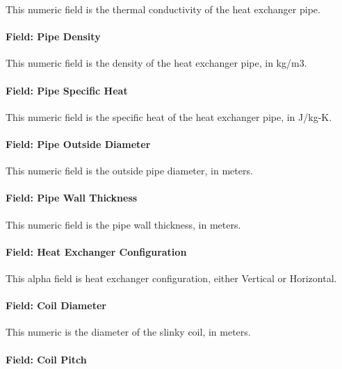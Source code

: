 This numeric field is the thermal conductivity of the heat exchanger pipe.

\paragraph{Field: Pipe Density}\label{field-pipe-density}

This numeric field is the density of the heat exchanger pipe, in kg/m3.

\paragraph{Field: Pipe Specific Heat}\label{field-pipe-specific-heat}

This numeric field is the specific heat of the heat exchanger pipe, in J/kg-K.

\paragraph{Field: Pipe Outside Diameter}\label{field-pipe-outside-diameter}

This numeric field is the outside pipe diameter, in meters.

\paragraph{Field: Pipe Wall Thickness}\label{field-pipe-wall-thickness}

This numeric field is the pipe wall thickness, in meters.

\paragraph{Field: Heat Exchanger Configuration}\label{field-heat-exchanger-configuration}

This alpha field is heat exchanger configuration, either Vertical or Horizontal.

\paragraph{Field: Coil Diameter}\label{field-coil-diameter}

This numeric is the diameter of the slinky coil, in meters.

\paragraph{Field: Coil Pitch}\label{field-coil-pitch}

